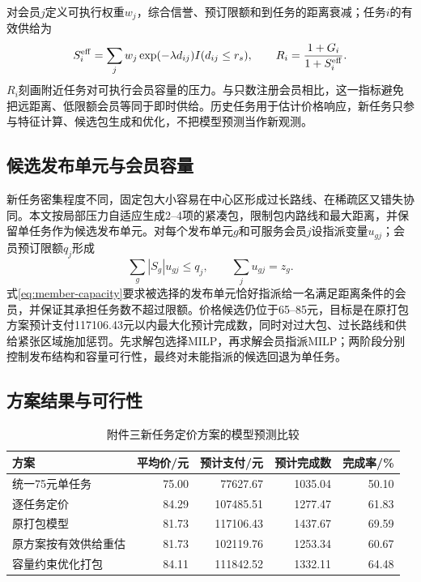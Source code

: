 ﻿\documentclass[UTF8,zihao=-4,a4paper,fontset=fandol]{ctexart}
\begin{document}
对会员$j$定义可执行权重$w_j$，综合信誉、预订限额和到任务的距离衰减；任务$i$的有效供给为
\begin{equation}
 S_i^{\rm eff}=\sum_j w_j\exp(-\lambda d_{ij})I(d_{ij}\leq r_s),
 \qquad R_i=\frac{1+G_i}{1+S_i^{\rm eff}}.
 \label{eq:effective-supply}
\end{equation}
$R_i$刻画附近任务对可执行会员容量的压力。与只数注册会员相比，这一指标避免把远距离、低限额会员等同于即时供给。历史任务用于估计价格响应，新任务只参与特征计算、候选包生成和优化，不把模型预测当作新观测。

\subsection{候选发布单元与会员容量}

新任务密集程度不同，固定包大小容易在中心区形成过长路线、在稀疏区又错失协同。本文按局部压力自适应生成2--4项的紧凑包，限制包内路线和最大距离，并保留单任务作为候选发布单元。对每个发布单元$g$和可服务会员$j$设指派变量$u_{gj}$；会员预订限额$q_j$形成
\begin{equation}
 \sum_g |S_g|u_{gj}\leq q_j,\qquad
 \sum_j u_{gj}=z_g.
 \label{eq:member-capacity}
\end{equation}
式\eqref{eq:member-capacity}要求被选择的发布单元恰好指派给一名满足距离条件的会员，并保证其承担任务数不超过限额。价格候选仍位于65--85元，目标是在原打包方案预计支付117106.43元以内最大化预计完成数，同时对过大包、过长路线和供给紧张区域施加惩罚。先求解包选择MILP，再求解会员指派MILP；两阶段分别控制发布结构和容量可行性，最终对未能指派的候选回退为单任务。

\subsection{方案结果与可行性}

\begin{table}[H]
\centering
\caption{附件三新任务定价方案的模型预测比较}
\begin{tabular}{lrrrr}
\toprule
方案 & 平均价/元 & 预计支付/元 & 预计完成数 & 完成率/\%\\
\midrule
统一75元单任务 & 75.00 & 77627.67 & 1035.04 & 50.10\\
逐任务定价 & 84.29 & 107485.51 & 1277.47 & 61.83\\
原打包模型 & 81.73 & 117106.43 & 1437.67 & 69.59\\
原方案按有效供给重估 & 81.73 & 102119.76 & 1253.34 & 60.67\\
容量约束优化打包 & 84.11 & 111842.52 & 1332.11 & 64.48\\
\bottomrule
\end{tabular}
\label{tab:q4-results}
\end{table}
\end{document}
